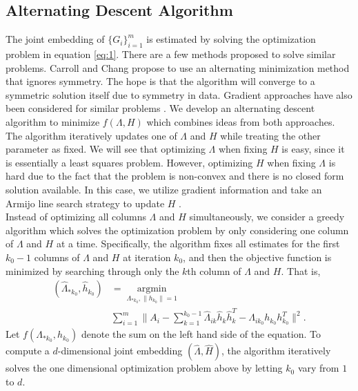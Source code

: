 \documentclass[10pt,journal,compsoc]{IEEEtran}
\begin{document}
\subsection{Alternating Descent Algorithm}
\noindent The joint embedding of $\{G_i \} _{i=1}^{m}$ is estimated by solving the optimization problem in equation \eqref{eq:1}. There are a few methods proposed to solve similar problems. Carroll and Chang \cite{carroll1970analysis} propose to use an alternating minimization method that ignores symmetry. The hope is that the algorithm will converge to a symmetric solution itself due to symmetry in data. Gradient approaches have also been considered for similar problems \cite{tang2009clustering} \cite{kolda2015numerical}. We develop an alternating descent algorithm to minimize $f(\Lambda,H)$ which combines ideas from both approaches. The algorithm iteratively updates one of $\Lambda$ and $H$ while treating the other parameter as fixed. We will see that optimizing $\Lambda$ when fixing $H$ is easy, since it is essentially a least squares problem. However, optimizing $H$ when fixing $\Lambda$ is hard due to the fact that the problem is non-convex and there is no closed form solution available. In this case, we utilize gradient information and take an Armijo line search strategy to update $H$ \cite{nocedal2006numerical}. \\

\noindent Instead of optimizing all columns $\Lambda$ and $H$ simultaneously, we consider a greedy algorithm which solves the optimization problem by only considering one column of  $\Lambda$ and $H$ at a time. Specifically, the algorithm fixes all estimates for the first $k_0-1$ columns of $\Lambda$ and $H$ at iteration $k_0$, and then the objective function is minimized by searching through only the $k$th column of $\Lambda$ and $H$. That is,
\begin{align}(\hat{\Lambda}_{*k_0},\hat{h}_{k_0}) &= \underset{\Lambda_{*k_0},\|h_{k_0}\|=1}{\operatorname{argmin}} \nonumber\\ &\sum\limits_{i=1}^{m} \| A_i- \sum\limits_{k=1}^{k_0-1} \hat{\Lambda}_{ik} \hat{h}_{k} \hat{h}_{k}^T -\Lambda_{ik_0} h_{k_0} h_{k_0}^T\|  ^2.
\label{eq:2}
\end{align} 
Let $f(\Lambda_{*k_0},h_{k_0})$ denote the sum on the left hand side of the equation. To compute a $d$-dimensional joint embedding $(\hat{\Lambda},\hat{H})$, the algorithm iteratively solves the one dimensional optimization problem above by letting $k_0$ vary from $1$ to $d$. \\
\end{document}
